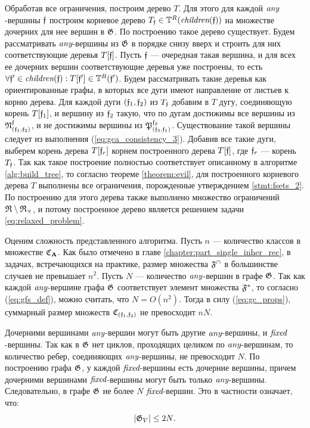 Обработав все ограничения, построим дерево $T$. Для этого для каждой $\textit{any}$-вершины $\mathfrak{f}$ построим корневое дерево $T_{\mathfrak{f}} \in \mathbb{T}^R(\textit{children}(\mathfrak{f}))$ на множестве дочерних для нее вершин в $\mathfrak{G}$. По построению такое дерево существует. Будем рассматривать $\textit{any}$-вершины из $\mathfrak{G}$ в порядке снизу вверх и строить для них соответствующие деревья $T[\mathfrak{f}]$. Пусть $\mathfrak{f}$ --- очередная такая вершина, и для всех ее дочерних вершин соответствующие деревья уже построены, то есть $\forall \mathfrak{f}' \in \textit{children}(\mathfrak{f}): T[\mathfrak{f}'] \in \mathbb{T}^R(\mathfrak{f}')$. Будем рассматривать такие деревья как ориентированные графы, в которых все дуги имеют направление от листьев к корню дерева. Для каждой дуги $(\mathfrak{f}_1, \mathfrak{f}_2)$ из $T_{\mathfrak{f}}$ добавим в $T$ дугу, соединяющую корень $T[\mathfrak{f}_1]$, и вершину из $\mathfrak{f}_2$ такую, что по дугам достижимы все вершины из $\mathfrak{N}^{\mathfrak{f}}_{(\mathfrak{f}_1, \mathfrak{f}_2)}$, и не достижимы вершины из $\mathfrak{P}^{\mathfrak{f}_2}_{(\mathfrak{f}_3, \mathfrak{f}_1)}$. Существование такой вершины следует из выполнения (\ref{eq:gca_consistency_3}). Добавив все такие дуги, выберем корень дерева $T[\mathfrak{f}_r]$ корнем построенного дерева $T[\mathfrak{f}]$, где $\mathfrak{f}_r$ --- корень $T_{\mathfrak{f}}$. Так как такое построение полностью соответствует описанному в алгоритме \ref{alg:build_tree}, то согласно теореме \ref{theorem:evil}, для построенного корневого дерева $T$ выполнены все ограничения, порожденные утверждением \ref{stmt:fsets_2}. По построению для этого дерева также выполнено множество ограничений $\mathfrak{R} \setminus \mathfrak{R}_{\times}$, и потому построенное дерево является решением задачи \ref{eq:relaxed_problem}.


Оценим сложность представленного алгоритма. Пусть $n$ --- количество классов в множестве $\mathfrak{C}_{\mathbf{A}}$. Как было отмечено в главе \ref{chapter:part_single_inher_rec}, в задачах, встречающихся на практике, размер множества $\mathfrak{F}^{\cap}$ в большинстве случаев не превышает $n^2$. Пусть $N$ --- количество $\textit{any}$-вершин в графе $\mathfrak{G}$. Так как каждой $\textit{any}$-вершине графа $\mathfrak{G}$ соответствует элемент множества $\mathfrak{F}^*$, то согласно (\ref{eq:gfs_def}), можно считать, что $N = O(n^2)$. Тогда в силу (\ref{eq:gc_props}), суммарный размер множеств $\mathfrak{C}_{(\mathfrak{f}_1, \mathfrak{f}_2)}$ не превосходит $nN$.

Дочерними вершинами $\textit{any}$-вершин могут быть другие $\textit{any}$-вершины, и $\textit{fixed}$-вершины. Так как в $\mathfrak{G}$ нет циклов, проходящих целиком по $\textit{any}$-вершинам, то количество ребер, соединяющих $\textit{any}$-вершины, не превосходит $N$. По построению графа $\mathfrak{G}$, у каждой $\textit{fixed}$-вершины есть дочерние вершины, причем дочерними вершинами $\textit{fixed}$-вершины могут быть только $\textit{any}$-вершины. Следовательно, в графе $\mathfrak{G}$ не более $N$ $\textit{fixed}$-вершин. Это в частности означает, что:
\begin{equation}\label{eq:vertices_in_ggv}
|\mathfrak{G}_V| \le 2N \text{.}
\end{equation}

